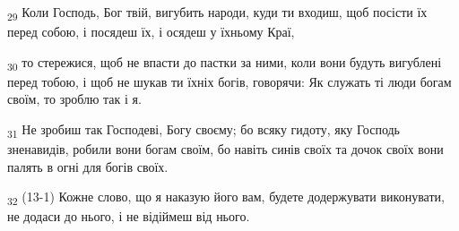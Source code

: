 \begin{tcolorbox}
\textsubscript{29} Коли Господь, Бог твій, вигубить народи, куди ти входиш, щоб посісти їх перед собою, і посядеш їх, і осядеш у їхньому Краї,
\end{tcolorbox}
\begin{tcolorbox}
\textsubscript{30} то стережися, щоб не впасти до пастки за ними, коли вони будуть вигублені перед тобою, і щоб не шукав ти їхніх богів, говорячи: Як служать ті люди богам своїм, то зроблю так і я.
\end{tcolorbox}
\begin{tcolorbox}
\textsubscript{31} Не зробиш так Господеві, Богу своєму; бо всяку гидоту, яку Господь зненавидів, робили вони богам своїм, бо навіть синів своїх та дочок своїх вони палять в огні для богів своїх.
\end{tcolorbox}
\begin{tcolorbox}
\textsubscript{32} (13-1) Кожне слово, що я наказую його вам, будете додержувати виконувати, не додаси до нього, і не відіймеш від нього.
\end{tcolorbox}

